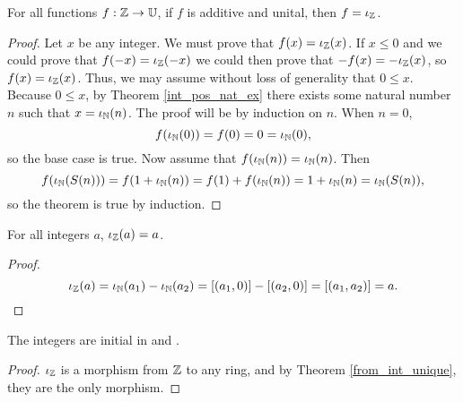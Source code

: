 \documentclass[../../math.tex]{subfiles}
\begin{document}
\begin{theorem} \label{from_int_unique}
    For all functions $f : \mathbb{Z} \to \mathbb{U}$, if $f$ is additive and unital, then $f =
    \iota_{\mathbb{Z}}$.
\end{theorem}
\begin{proof}
    Let $x$ be any integer.  We must prove that $f(x) = \iota_{\mathbb{Z}}(x)$.  If $x \leq 0$
    and we could prove that $f(-x) = \iota_{\mathbb{Z}}(-x)$ we could then prove that $-f(x) =
    -\iota_{\mathbb{Z}}(x)$, so $f(x) = \iota_{\mathbb{Z}}(x)$.  Thus, we may assume without loss of
    generality that $0 \leq x$.  Because $0 \leq x$, by Theorem
    \ref{int_pos_nat_ex} there exists some natural number $n$ such that $x =
    \iota_{\mathbb{N}}(n)$.  The proof will be by induction on $n$.  When $n = 0$,
    \[
        f(\iota_{\mathbb{N}}(0)) = f(0) = 0 = \iota_{\mathbb{N}}(0),
    \]
    so the base case is true.  Now assume that $f(\iota_{\mathbb{N}}(n)) = \iota_{\mathbb{N}}(n)$.  Then
    \[
        f(\iota_{\mathbb{N}}(S(n))) = f(1 + \iota_{\mathbb{N}}(n)) = f(1) + f(\iota_{\mathbb{N}}(n)) = 1 + \iota_{\mathbb{N}}(n) =
        \iota_{\mathbb{N}}(S(n)),
    \]
    so the theorem is true by induction.
\end{proof}

\begin{theorem}
    For all integers $a$, $\iota_{\mathbb{Z}}(a) = a$.
\end{theorem}
\begin{proof}
    \[
        \iota_{\mathbb{Z}}(a) = \iota_{\mathbb{N}}(a_1) - \iota_{\mathbb{N}}(a_2) = [(a_1, 0)] - [(a_2, 0)] = [(a_1, a_2)] =
        a.
    \]
\end{proof}

\begin{theorem}
    The integers are initial in  and .
\end{theorem}
\begin{proof}
    $\iota_{\mathbb{Z}}$ is a morphism from $\mathbb{Z}$ to any ring, and by Theorem
    \ref{from_int_unique}, they are the only morphism.
\end{proof}
\end{document}
